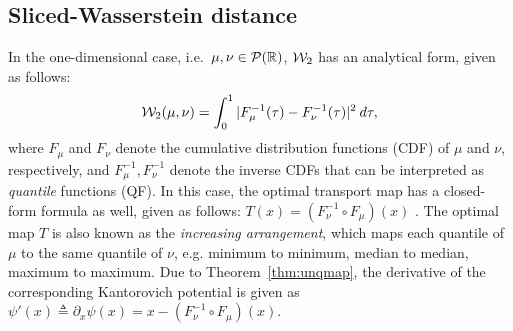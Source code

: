 




\subsection{Sliced-Wasserstein distance}
\label{sec:sw}

In the one-dimensional case, i.e.\ $\mu,\nu \in {\cal P}(\mathbb{R})$, ${\cal W}_2$ has an analytical form, given as follows:
\begin{align}
{\cal W}_2(\mu,\nu) = \int_0^1 |F_\mu^{-1}(\tau) - F_\nu^{-1}(\tau)|^2 \> d\tau,\label{eq:W1D}
\end{align}
where $F_\mu$ and $F_\nu$ denote the cumulative distribution functions (CDF) of $\mu$ and $\nu$, respectively, and $F^{-1}_\mu, F^{-1}_\nu$ denote the inverse CDFs that can be interpreted as \emph{quantile} functions (QF).
%
In this case, the optimal transport map has a closed-form formula as well, given as follows: $T(x) = (F_\nu^{-1} \circ F_\mu) (x)$ \cite{villani2008optimal}. The optimal map $T$ is also known as the \emph{increasing arrangement}, which maps each quantile of $\mu$ to the same quantile of $\nu$, e.g. minimum to minimum, median to median, maximum to maximum.
%
Due to Theorem~\ref{thm:unqmap}, the derivative of the corresponding Kantorovich potential is given as $\psi'(x) \triangleq \partial_x \psi(x) = x- (F_\nu^{-1} \circ F_\mu) (x)$.

